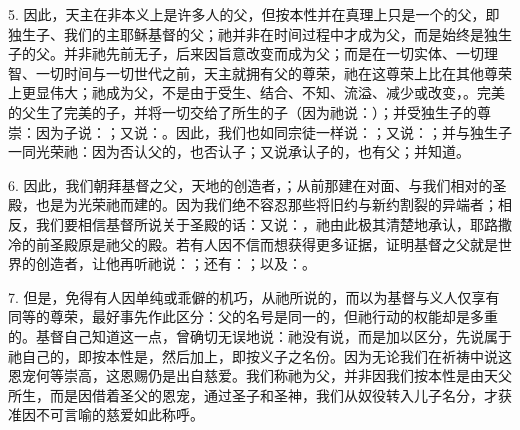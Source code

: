 5. 因此，天主在非本义上是许多人的父，但按本性并在真理上只是一个的父，即独生子、我们的主耶稣基督的父；祂并非在时间过程中才成为父，而是始终是独生子的父。并非祂先前无子，后来因旨意改变而成为父；而是在一切实体、一切理智、一切时间与一切世代之前，天主就拥有父的尊荣，祂在这尊荣上比在其他尊荣上更显伟大；祂成为父，不是由于受生、结合、不知、流溢、减少或改变，。完美的父生了完美的子，并将一切交给了所生的子（因为祂说：）；并受独生子的尊崇：因为子说：；又说：。因此，我们也如同宗徒一样说：；又说：；并与独生子一同光荣祂：因为否认父的，也否认子；又说承认子的，也有父；并知道。\par

6. 因此，我们朝拜基督之父，天地的创造者，\newline{}；从前那建在对面、与我们相对的圣殿，也是为光荣祂而建的。因为我们绝不容忍那些将旧约与新约割裂的异端者；相反，我们要相信基督所说关于圣殿的话：又说：，祂由此极其清楚地承认，耶路撒冷的前圣殿原是祂父的殿。若有人因不信而想获得更多证据，证明基督之父就是世界的创造者，让他再听祂说：；还有：；以及：。\par

7. 但是，免得有人因单纯或乖僻的机巧，从祂所说的，而以为基督与义人仅享有同等的尊荣，最好事先作此区分：父的名号是同一的，但祂行动的权能却是多重的。基督自己知道这一点，曾确切无误地说：祂没有说，而是加以区分，先说属于祂自己的，即按本性是，然后加上，即按义子之名份。因为无论我们在祈祷中说这恩宠何等崇高，这恩赐仍是出自慈爱。我们称祂为父，并非因我们按本性是由天父所生，而是因借着圣父的恩宠，通过圣子和圣神，我们从奴役转入儿子名分，才获准因不可言喻的慈爱如此称呼。\par

